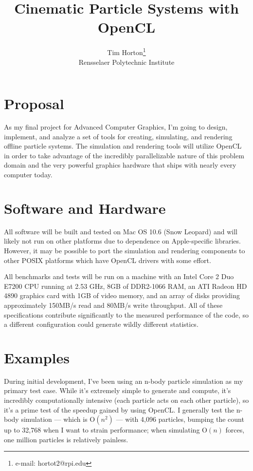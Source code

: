 \documentclass{acmsiggraph}
\title{Cinematic Particle Systems with OpenCL}
\author{Tim Horton\thanks{e-mail: hortot2@rpi.edu}\\Rensselaer Polytechnic Institute}
\begin{document}
\maketitle

\section{Proposal}

As my final project for Advanced Computer Graphics, I'm going to design, implement, and analyze a set of tools for creating, simulating, and rendering offline particle systems. The simulation and rendering tools will utilize OpenCL in order to take advantage of the incredibly parallelizable nature of this problem domain and the very powerful graphics hardware that ships with nearly every computer today.

\section{Software and Hardware}

All software will be built and tested on Mac OS 10.6 (Snow Leopard) and will likely not run on other platforms due to dependence on Apple-specific libraries. However, it may be possible to port the simulation and rendering components to other POSIX platforms which have OpenCL drivers with some effort.

All benchmarks and tests will be run on a machine with an Intel Core 2 Duo E7200 CPU running at 2.53 GHz, 8GB of DDR2-1066 RAM, an ATI Radeon HD 4890 graphics card with 1GB of video memory, and an array of disks providing approximately 150MB/s read and 80MB/s write throughput. All of these specifications contribute significantly to the measured performance of the code, so a different configuration could generate wildly different statistics.

\section{Examples}

During initial development, I've been using an n-body particle simulation as my primary test case. While it's extremely simple to generate and compute, it's incredibly computationally intensive (each particle acts on each other particle), so it's a prime test of the speedup gained by using OpenCL. I generally test the n-body simulation --- which is $\textrm{O}(n^2)$ --- with 4,096 particles, bumping the count up to 32,768 when I want to strain performance; when simulating $\textrm{O}(n)$ forces, one million particles is relatively painless.
\end{document}
